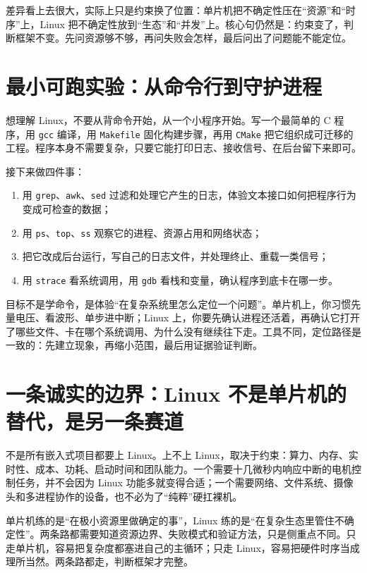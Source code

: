 差异看上去很大，实际上只是约束换了位置：单片机把不确定性压在“资源”和“时序”上，Linux 把不确定性放到“生态”和“并发”上。核心句仍然是：约束变了，判断框架不变。先问资源够不够，再问失败会怎样，最后问出了问题能不能定位。

\section{最小可跑实验：从命令行到守护进程}

想理解 Linux，不要从背命令开始，从一个小程序开始。写一个最简单的 C 程序，用 \texttt{gcc} 编译，用 \texttt{Makefile} 固化构建步骤，再用 \texttt{CMake} 把它组织成可迁移的工程。程序本身不需要复杂，只要它能打印日志、接收信号、在后台留下来即可。

接下来做四件事：

\begin{enumerate}
\item 用 \texttt{grep}、\texttt{awk}、\texttt{sed} 过滤和处理它产生的日志，体验文本接口如何把程序行为变成可检查的数据；
\item 用 \texttt{ps}、\texttt{top}、\texttt{ss} 观察它的进程、资源占用和网络状态；
\item 把它改成后台运行，写自己的日志文件，并处理终止、重载一类信号；
\item 用 \texttt{strace} 看系统调用，用 \texttt{gdb} 看栈和变量，确认程序到底卡在哪一步。
\end{enumerate}

目标不是学命令，是体验“在复杂系统里怎么定位一个问题”。单片机上，你习惯先量电压、看波形、单步进中断；Linux 上，你要先确认进程还活着，再确认它打开了哪些文件、卡在哪个系统调用、为什么没有继续往下走。工具不同，定位路径是一致的：先建立现象，再缩小范围，最后用证据验证判断。

\section{一条诚实的边界：Linux 不是单片机的替代，是另一条赛道}

不是所有嵌入式项目都要上 Linux。上不上 Linux，取决于约束：算力、内存、实时性、成本、功耗、启动时间和团队能力。一个需要十几微秒内响应中断的电机控制任务，并不会因为 Linux 功能多就变得合适；一个需要网络、文件系统、摄像头和多进程协作的设备，也不必为了“纯粹”硬扛裸机。

单片机练的是“在极小资源里做确定的事”，Linux 练的是“在复杂生态里管住不确定性”。两条路都需要知道资源边界、失败模式和验证方法，只是侧重点不同。只走单片机，容易把复杂度都塞进自己的主循环；只走 Linux，容易把硬件时序当成理所当然。两条路都走，判断框架才完整。

